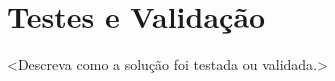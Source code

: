 
\section{Testes e Validação}\label{sec:testes}

<Descreva como a solução foi testada ou validada.>

%
%
%
%
%

